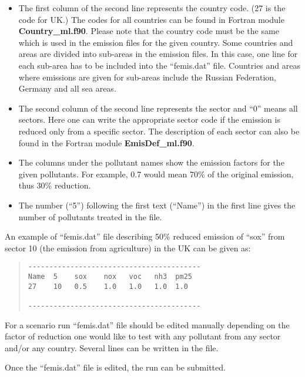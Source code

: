 \begin{itemize}

\item The first column of
the second line represents the country code. (27 is the code for UK.)
The codes for all countries can be found in  Fortran module {\bf
  Country\_ml.f90}. Please note that the country code must be the same
which is used in the emission files for the given country. Some
countries and areas are divided into sub-areas in the emission
files. In this case, one line for each sub-area has to be included
into the ``femis.dat'' file. Countries and areas where emissions are
given for sub-areas include the Russian Federation, Germany and all 
sea areas.    

\item The second
column of the second line 
represents the sector and ``0'' means all sectors. Here one can write
the appropriate sector code if the emission is reduced only from a specific
sector. The description of each sector can also be found in the Fortran
module {\bf EmisDef\_ml.f90}. 

\item The columns under the pollutant names show the emission factors
  for the given pollutants. For example, 0.7 would mean 70\% of the
  original emission, thus 30\% reduction.


\item The number (``5'') following
the first text (``Name'') in the first line gives the number of
pollutants treated in the file.   
              
\end{itemize}

An example of ``femis.dat'' file describing 50\% reduced emission of
``sox'' from sector 10 (the emission from agriculture) in the UK can be given as:  
\begin{quote}
\begin{verbatim}
-----------------------------------------
Name  5    sox    nox   voc   nh3  pm25 
27    10   0.5    1.0   1.0   1.0  1.0   

-----------------------------------------
\end{verbatim}        
\end{quote}
For a scenario run ``femis.dat'' file should be edited 
manually depending on the factor of
reduction one would like to test with any pollutant from any sector
and/or any country. Several lines can be written in the file.

Once the ``femis.dat''  file is
edited, the run can be submitted.  



